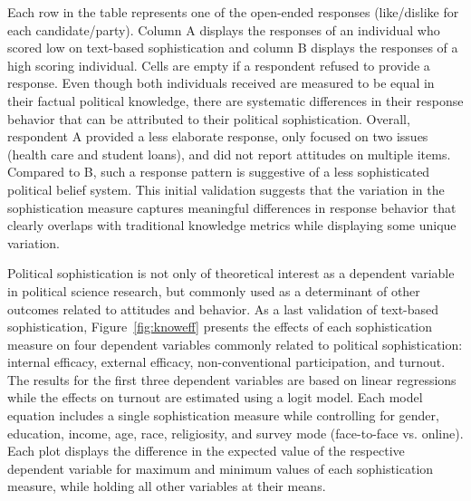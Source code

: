 \documentclass[12pt]{article}
\begin{document}
Each row in the table represents one of the open-ended responses (like/dislike for each candidate/party). Column A displays the responses of an individual who scored low on text-based sophistication and column B displays the responses of a high scoring individual. Cells are empty if a respondent refused to provide a response. Even though both individuals received are measured to be equal in their factual political knowledge, there are systematic differences in their response behavior that can be attributed to their political sophistication. Overall, respondent A provided a less elaborate response, only focused on two issues (health care and student loans), and did not report attitudes on multiple items. Compared to B, such a response pattern is suggestive of a less sophisticated political belief system. This initial validation suggests that the variation in the sophistication measure captures meaningful differences in response behavior that clearly overlaps with traditional knowledge metrics while displaying some unique variation.

Political sophistication is not only of theoretical interest as a dependent variable in political science research, but commonly used as a determinant of other outcomes related to attitudes and behavior. As a last validation of text-based sophistication, Figure~\ref{fig:knoweff} presents the effects of each sophistication measure on four dependent variables commonly related to political sophistication: internal efficacy, external efficacy, non-conventional participation, and turnout. The results for the first three dependent variables are based on linear regressions while the effects on turnout are estimated using a logit model. Each model equation includes a single sophistication measure while controlling for gender, education, income, age, race, religiosity, and survey mode (face-to-face vs. online). Each plot displays the difference in the expected value of the respective dependent variable for maximum and minimum values of each sophistication measure, while holding all other variables at their means.
\end{document}
